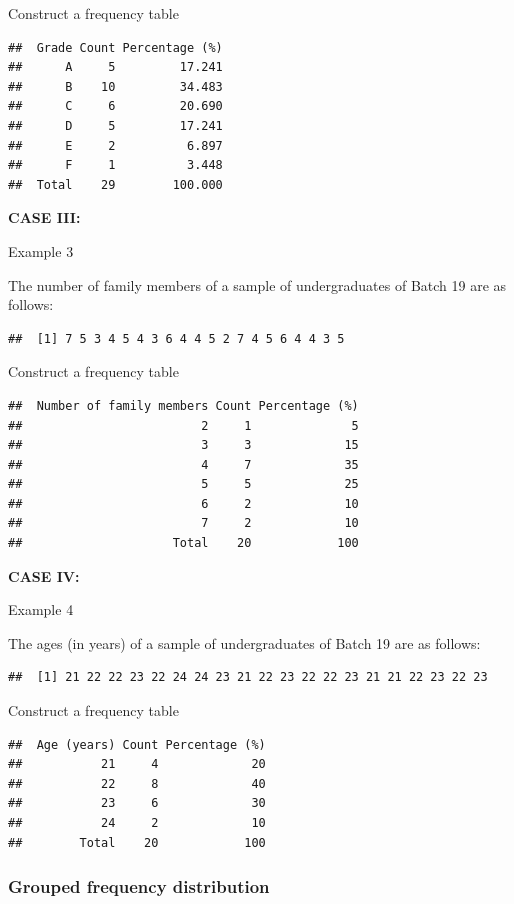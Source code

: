 \documentclass[]{book}
\begin{document}
Construct a frequency table

\begin{verbatim}
##  Grade Count Percentage (%)
##      A     5         17.241
##      B    10         34.483
##      C     6         20.690
##      D     5         17.241
##      E     2          6.897
##      F     1          3.448
##  Total    29        100.000
\end{verbatim}

\textbf{CASE III:}

Example 3

The number of family members of a sample of undergraduates of Batch 19 are as follows:

\begin{verbatim}
##  [1] 7 5 3 4 5 4 3 6 4 4 5 2 7 4 5 6 4 4 3 5
\end{verbatim}

Construct a frequency table

\begin{verbatim}
##  Number of family members Count Percentage (%)
##                         2     1              5
##                         3     3             15
##                         4     7             35
##                         5     5             25
##                         6     2             10
##                         7     2             10
##                     Total    20            100
\end{verbatim}

\textbf{CASE IV:}

Example 4

The ages (in years) of a sample of undergraduates of Batch 19 are as follows:

\begin{verbatim}
##  [1] 21 22 22 23 22 24 24 23 21 22 23 22 22 23 21 21 22 23 22 23
\end{verbatim}

Construct a frequency table

\begin{verbatim}
##  Age (years) Count Percentage (%)
##           21     4             20
##           22     8             40
##           23     6             30
##           24     2             10
##        Total    20            100
\end{verbatim}

\hypertarget{grouped-frequency-distribution}{%
\subsubsection{Grouped frequency distribution}\label{grouped-frequency-distribution}}
\end{document}
